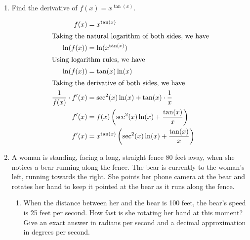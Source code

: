 \documentclass{article}
\begin{document}
\begin{enumerate}
\begin{solution}
\begin{align*}
        \sec^2\theta \frac{d\theta}{dt}&=
        2\cdot \frac{dx}{dt}
    \end{align*}
    Each revolution is $2\pi$ radians, so we know $\dfrac{d\theta}{dt}=2\pi*6=12\pi$, and since $\theta$ is decreasing, this rate is $-12\pi$ radians/minute. We also know that $\cos \theta = 0.5$, which means $\sec \theta = 2$. Evaluating, we have:
    \begin{align*}
        (2)^2 \cdot (-12\pi) &= 2 \cdot \frac{dx}{dt}\\
        -24\pi &= \frac{dx}{dt}
    \end{align*}
    We have found that the searchlight is moving at a rate of 
\end{solution}


\item 
\begin{problem}
    Find the derivative of $f(x)=x^{\tan(x)}$.
\end{problem}
\pspace{\vfill}

\begin{solution}
    \begin{align*}
        f(x)&= x^{\tan(x)}\\
        \intertext{Taking the natural logarithm of both sides, we have}
        \ln(f(x))&=\ln(x^{\tan(x)})\\
        \intertext{Using logarithm rules, we have}
        \ln(f(x))&=\tan(x)\ln(x)\\
        \intertext{Taking the derivative of both sides, we have}
        \frac{1}{f(x)}\cdot f'(x) &= \sec^2(x)\ln(x)+\tan(x)\cdot\frac{1}{x}\\
        f'(x) &= f(x)\left(\sec^2(x)\ln(x)+\frac{\tan(x)}{x}\right)\\
        f'(x) &= x^{\tan(x)}\left(\sec^2(x)\ln(x)+\frac{\tan(x)}{x}\right)
    \end{align*} 
\end{solution}

\pspace{\newpage}


\item
\begin{problem}
  A woman is standing, facing a long, straight fence 80 feet away, when
  she notices a bear running along the fence. The bear is currently to the woman's left, running towards the right. She points her phone camera at the bear and rotates her hand to keep it pointed at the bear as it runs along the fence.
  \end{problem}
  \begin{enumerate}
  \item  
  \begin{problem}
      When the distance between her and the bear is 100
    feet, the bear's speed is 25 feet per second. How fast
    is she rotating her hand at this moment? Give an exact answer in radians per second and a decimal approximation in degrees per second.
  \end{problem}


\end{enumerate}
\end{enumerate}
\end{document}
